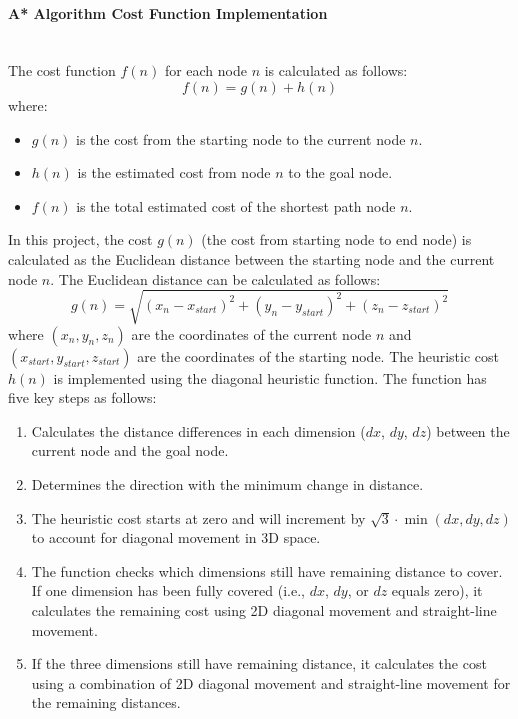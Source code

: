 \documentclass[12pt, a4paper]{article}
\begin{document}
\paragraph{A* Algorithm Cost Function Implementation} ~\\
The cost function $f(n)$ for each node $n$ is calculated as follows:
\begin{equation}
    f(n) = g(n) + h(n)  
\end{equation}
where:
\begin{itemize}
    \item $g(n)$ is the cost from the starting node to the current node $n$.
    \item $h(n)$ is the estimated cost from node $n$ to the goal node.
    \item $f(n)$ is the total estimated cost of the shortest path node $n$.
\end{itemize}
In this project, the cost $g(n)$ (the cost from starting node to end node) is calculated as the Euclidean distance
between the starting node and the current node $n$.
The Euclidean distance can be calculated as follows:
\begin{equation}
    g(n) = \sqrt{(x_n - x_{start})^2 + (y_n - y_{start})^2 + (z_n - z_{start})^2}  
\end{equation}
where $(x_n, y_n, z_n)$ are the coordinates of the current node $n$ and
$(x_{start}, y_{start}, z_{start})$ are the coordinates of the starting node.
The heuristic cost $h(n)$ is implemented using the diagonal heuristic function. The function has five key steps as follows:
\begin{enumerate}
    \item Calculates the distance differences in each dimension ($dx$, $dy$, $dz$) between the current node and the goal node.
    \item Determines the direction with the minimum change in distance.
    \item The heuristic cost starts at zero and will increment by $\sqrt{3} \cdot \min(dx, dy, dz)$ to account for diagonal movement in 3D space.
    \item The function checks which dimensions still have remaining distance to
    cover. If one dimension has been fully covered (i.e., $dx$, $dy$, or $dz$
    equals zero), it calculates the remaining cost using 2D diagonal movement
    and straight-line movement.
    \item If the three dimensions still have remaining distance, it calculates
    the cost using a combination of 2D diagonal movement and straight-line
    movement for the remaining distances.
\end{enumerate}
\end{document}
